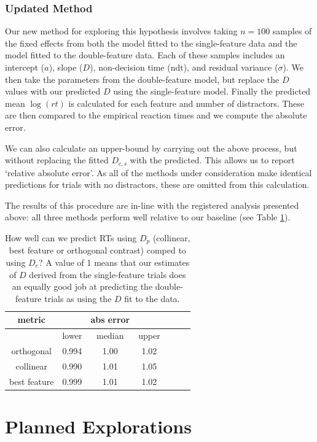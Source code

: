 \documentclass[preprint,12pt,authoryear]{elsarticle}
\begin{document}
\subsubsection{Updated Method}

Our new method for exploring this hypothesis involves taking $n=100$ samples of the fixed effects from both the model fitted to the single-feature data and the model fitted to the double-feature data. Each of these samples includes an intercept ($a$), slope ($D$), non-decision time ($\text{ndt}$), and residual variance ($\sigma$). We then take the parameters from the double-feature model, but replace the $D$ values with our predicted $D$ using the single-feature model. Finally the predicted mean $\log(rt)$ is calculated for each feature and number of distractors. These are then compared to the empirical reaction times and we compute the absolute error.

We can also calculate an upper-bound by carrying out the above process, but without replacing the fitted $D_{c,s}$ with the predicted. This allows us to report `relative absolute error'. As all of the methods under consideration make identical predictions for trials with no distractors, these are omitted from this calculation. 

The results of this procedure are in-line with the registered analysis presented above: all three methods perform well relative to our baseline (see Table \ref{tab:new_pred_rt}).

\begin{table}[h]
\centering
\begin{tabular}{c|ccc|ccc} 
\hline
metric & & abs error & &   \\
 \hline
  & lower  & median & upper \\
 
orthogonal & 0.994 & 1.00 & 1.02 \\
collinear & 0.990 & 1.01 & 1.05\\ 
best feature  & 0.999 & 1.01 & 1.02 \\
 \end{tabular}
\caption{How well can we predict RTs using $D_p$ (collinear, best feature or orthogonal contrast) comped to using $D_e$? A value of 1 means that our estimates of $D$ derived from the single-feature trials does an equally good job at predicting the double-feature trials as using the $D$ fit to the data.}
\label{tab:new_pred_rt}
\end{table}


\section{Planned Explorations}
\end{document}
